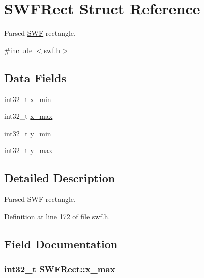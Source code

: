 \hypertarget{struct_s_w_f_rect}{\section{S\-W\-F\-Rect Struct Reference}
\label{struct_s_w_f_rect}
}


Parsed \hyperlink{struct_s_w_f}{S\-W\-F} rectangle.  




{\ttfamily \#include $<$swf.\-h$>$}

\subsection*{Data Fields}
\begin{DoxyCompactItemize}
\item 
int32\-\_\-t \hyperlink{struct_s_w_f_rect_a8a6e16836789a2ad0f04a47571521da5}{x\-\_\-min}
\item 
int32\-\_\-t \hyperlink{struct_s_w_f_rect_ac7003c5b218caff09e7720268dc9caf1}{x\-\_\-max}
\item 
int32\-\_\-t \hyperlink{struct_s_w_f_rect_a02bf454cdaad92d3e78497f85dccda5d}{y\-\_\-min}
\item 
int32\-\_\-t \hyperlink{struct_s_w_f_rect_ad4030c2fb8cf190685abbb1db5b60d9c}{y\-\_\-max}
\end{DoxyCompactItemize}


\subsection{Detailed Description}
Parsed \hyperlink{struct_s_w_f}{S\-W\-F} rectangle. 

Definition at line 172 of file swf.\-h.



\subsection{Field Documentation}
\hypertarget{struct_s_w_f_rect_ac7003c5b218caff09e7720268dc9caf1}{
\subsubsection[{x\-\_\-max}]{\setlength{\rightskip}{0pt plus 5cm}int32\-\_\-t S\-W\-F\-Rect\-::x\-\_\-max}}\label{struct_s_w_f_rect_ac7003c5b218caff09e7720268dc9caf1}


